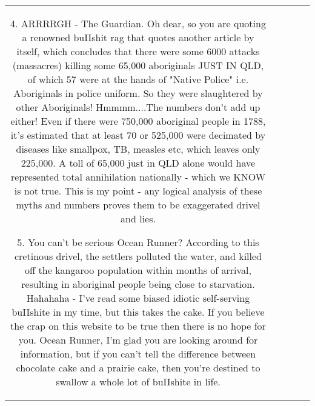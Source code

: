 \documentclass[11pt]{article}
\newlength\mylength
\begin{document}
\begin{center}
\begin{longtable}{|C{.65\mylength}|C{.30\mylength}|C{.12\mylength}|C{.12\mylength}|C{.12\mylength}|}
4. ARRRRGH - The Guardian. Oh dear, so you are quoting a renowned buIIshit rag that quotes another article by itself, which concludes that there were some 6000 attacks (massacres) killing some 65,000 aboriginals JUST IN QLD, of which 57 were at the hands of "Native Police" i.e. Aboriginals in police uniform. So they were slaughtered by other Aboriginals! Hmmmm....The numbers don't add up either! Even if there were 750,000 aboriginal people in 1788, it's estimated that at least 70 or 525,000 were decimated by diseases like smallpox, TB, measles etc, which leaves only 225,000. A toll of 65,000 just in QLD alone would have represented total annihilation nationally - which we KNOW is not true. This is my point - any logical analysis of these myths and numbers proves them to be exaggerated drivel and lies.

5. You can't be serious Ocean Runner? According to this cretinous drivel, the settlers polluted the water, and killed off the kangaroo population within months of arrival, resulting in aboriginal people being close to starvation. Hahahaha - I've read some biased idiotic self-serving buIIshite in my time, but this takes the cake.
 If you believe the crap on this website to be true then there is no hope for you.
Ocean Runner, I'm glad you are looking around for information, but if you can't tell the difference between chocolate cake and a prairie cake, then you're destined to swallow a whole lot of buIIshite in life.


\end{longtable}
\end{center}
\end{document}

